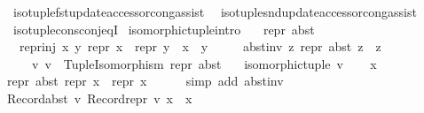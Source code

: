 \begin{isabellebody}
\ \ iso{\isacharunderscore}{\kern0pt}tuple{\isacharunderscore}{\kern0pt}fst{\isacharunderscore}{\kern0pt}update{\isacharunderscore}{\kern0pt}accessor{\isacharunderscore}{\kern0pt}cong{\isacharunderscore}{\kern0pt}assist\isanewline
\ \ iso{\isacharunderscore}{\kern0pt}tuple{\isacharunderscore}{\kern0pt}snd{\isacharunderscore}{\kern0pt}update{\isacharunderscore}{\kern0pt}accessor{\isacharunderscore}{\kern0pt}cong{\isacharunderscore}{\kern0pt}assist\isanewline
\ \ iso{\isacharunderscore}{\kern0pt}tuple{\isacharunderscore}{\kern0pt}cons{\isacharunderscore}{\kern0pt}conj{\isacharunderscore}{\kern0pt}eqI\isanewline
\isanewline
{}\isamarkupfalse%
\isanewline
\isanewline
{}\isamarkupfalse%
\ isomorphic{\isacharunderscore}{\kern0pt}tuple{\isacharunderscore}{\kern0pt}intro{\isacharcolon}{\kern0pt}\isanewline
\ \ \ repr\ abst\isanewline
\ \ \ repr{\isacharunderscore}{\kern0pt}inj{\isacharcolon}{\kern0pt}\ {\isachardoublequoteopen}{\isasymAnd}x\ y{\isachardot}{\kern0pt}\ repr\ x\ {\isacharequal}{\kern0pt}\ repr\ y\ {\isasymlongleftrightarrow}\ x\ {\isacharequal}{\kern0pt}\ y{\isachardoublequoteclose}\isanewline
\ \ \ \ \ abst{\isacharunderscore}{\kern0pt}inv{\isacharcolon}{\kern0pt}\ {\isachardoublequoteopen}{\isasymAnd}z{\isachardot}{\kern0pt}\ repr\ {\isacharparenleft}{\kern0pt}abst\ z{\isacharparenright}{\kern0pt}\ {\isacharequal}{\kern0pt}\ z{\isachardoublequoteclose}\isanewline
\ \ \ \ \ v{\isacharcolon}{\kern0pt}\ {\isachardoublequoteopen}v\ {\isasymequiv}\ Tuple{\isacharunderscore}{\kern0pt}Isomorphism\ repr\ abst{\isachardoublequoteclose}\isanewline
\ \ \ {\isachardoublequoteopen}isomorphic{\isacharunderscore}{\kern0pt}tuple\ v{\isachardoublequoteclose}\isanewline
%
\isadelimproof
%
\endisadelimproof
%
\isatagproof
{}\isamarkupfalse%
\isanewline
\ \ \isamarkupfalse%
\ x\ \isamarkupfalse%
\ {\isachardoublequoteopen}repr\ {\isacharparenleft}{\kern0pt}abst\ {\isacharparenleft}{\kern0pt}repr\ x{\isacharparenright}{\kern0pt}{\isacharparenright}{\kern0pt}\ {\isacharequal}{\kern0pt}\ repr\ x{\isachardoublequoteclose}\isanewline
\ \ \ \ \isamarkupfalse%
\ {\isacharparenleft}{\kern0pt}simp\ add{\isacharcolon}{\kern0pt}\ abst{\isacharunderscore}{\kern0pt}inv{\isacharparenright}{\kern0pt}\isanewline
\ \ \isamarkupfalse%
\ \isamarkupfalse%
\ {\isachardoublequoteopen}Record{\isachardot}{\kern0pt}abst\ v\ {\isacharparenleft}{\kern0pt}Record{\isachardot}{\kern0pt}repr\ v\ x{\isacharparenright}{\kern0pt}\ {\isacharequal}{\kern0pt}\ x{\isachardoublequoteclose}\isanewline

\end{isabellebody}
